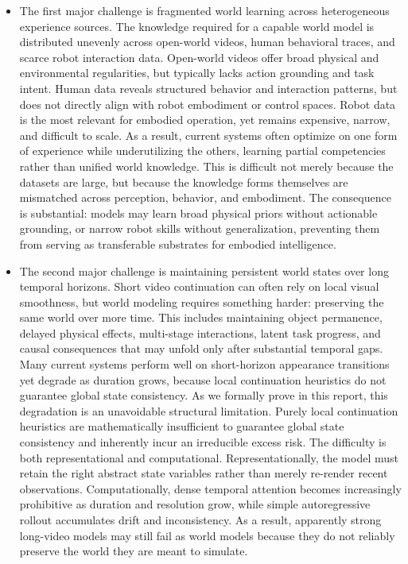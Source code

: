 \begin{itemize}
\item The first major challenge is fragmented world learning across heterogeneous experience sources. The knowledge required for a capable world model is distributed unevenly across open-world videos, human behavioral traces, and scarce robot interaction data. Open-world videos offer broad physical and environmental regularities, but typically lacks action grounding and task intent. Human data reveals structured behavior and interaction patterns, but does not directly align with robot embodiment or control spaces. Robot data is the most relevant for embodied operation, yet remains expensive, narrow, and difficult to scale. As a result, current systems often optimize on one form of experience while underutilizing the others, learning partial competencies rather than unified world knowledge. This is difficult not merely because the datasets are large, but because the knowledge forms themselves are mismatched across perception, behavior, and embodiment. The consequence is substantial: models may learn broad physical priors without actionable grounding, or narrow robot skills without generalization, preventing them from serving as transferable substrates for embodied intelligence.

\item The second major challenge is maintaining persistent world states over long temporal horizons. Short video continuation can often rely on local visual smoothness, but world modeling requires something harder: preserving the same world over more time. This includes maintaining object permanence, delayed physical effects, multi-stage interactions, latent task progress, and causal consequences that may unfold only after substantial temporal gaps. Many current systems perform well on short-horizon appearance transitions yet degrade as duration grows, because local continuation heuristics do not guarantee global state consistency. As we formally prove in this report, this degradation is an unavoidable structural limitation. Purely local continuation heuristics are mathematically insufficient to guarantee global state consistency and inherently incur an irreducible excess risk. The difficulty is both representational and computational. Representationally, the model must retain the right abstract state variables rather than merely re-render recent observations. Computationally, dense temporal attention becomes increasingly prohibitive as duration and resolution grow, while simple autoregressive rollout accumulates drift and inconsistency. As a result, apparently strong long-video models may still fail as world models because they do not reliably preserve the world they are meant to simulate.


\end{itemize}
